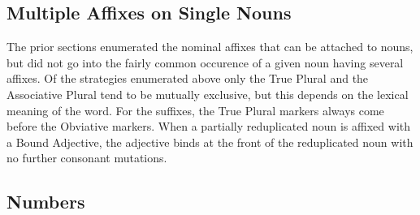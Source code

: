   \subsection{Multiple Affixes on Single Nouns}
  The prior sections enumerated the nominal affixes that can be attached to nouns, but did not go into the fairly common occurence of a given noun having several affixes. Of the strategies enumerated above only the True Plural and the Associative Plural tend to be mutually exclusive, but this depends on the lexical meaning of the word. For the suffixes, the True Plural markers always come before the Obviative markers. When a partially reduplicated noun is affixed with a Bound Adjective, the adjective binds at the front of the reduplicated noun with no further consonant mutations.
  \vertspace

  \subsection{Numbers}
